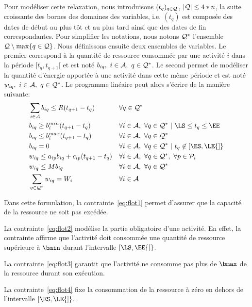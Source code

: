Pour modéliser cette relaxation, nous introduisons $(t_q)_{q \in {\cal Q}}$,
$| {\cal Q} | \le 4*n$, la suite croissante des bornes des domaines des
variables, i.e. $(t_q)$ est composée des dates de début au plus tôt et
au plus tard ainsi que des dates de fin correspondantes. Pour
simplifier les notations, nous notons ${\cal Q}^* $ l'ensemble ${\cal Q}
\setminus\max\{q \in {\cal Q}\}$. Nous définissons ensuite deux ensembles de
variables. Le premier correspond à la quantité de ressource consommée 
par une activité $i$ dans la période $[t_q,t_{q+1}[$ et est noté
$b_{iq},\ i \in {\cal A},\ q \in {\cal Q}^*$. Le second permet de modéliser la
quantité d'énergie apportée à une activité dans cette même période et
est noté $w_{iq},\ i \in {\cal A},\ q \in {\cal Q}^*$. Le programme linéaire peut
alors s'écrire de la manière suivante:
\begin{align}
  &\sum_{i \in \A} b_{iq} \le R(t_{q+1}- t_q) & & 
  \forall q \in \Q^* \label{eq:flot1}\\
  &b_{iq} \ge b_i^{min}(t_{q+1}-t_q) & & \forall i \in \A,
  \ \forall q \in \Q^*\ | \ \LS \le t_q \le \EE \label{eq:flot2}\\
  &b_{iq} \le b_i^{max} (t_{q+1} - t_q) & &
  \forall i \in \A,\ \forall q \in \Q^* \label{eq:flot3}\\
  &b_{iq}=0 & & \forall i \in \A, \ 
  \forall q \in \Q^*\  |\ t_q \not\in [\ES,\LE{]} \label{eq:flot4}\\  
  &w_{iq} \le a_{ip}b_{iq}+c_{ip}(t_{q+1}-t_q) & &
  \forall i \in \A, \ \forall q \in \Q^*,\  \forall p \in \P_i \label{eq:flot5}\\
  &w_{iq} \le Mb_{iq} & &
  \forall i \in \A,\ \forall q \in \Q^*\ \label{eq:flot6}\\
  &\sum_{q\in \Q^*} w_{iq} = W_i  & &
  \forall i \in \A \label{eq:flot7}
  \end{align}

Dans cette formulation, la contrainte~\eqref{eq:flot1} permet
d'assurer que la capacité de la ressource ne soit pas excédée. 

La contrainte~\eqref{eq:flot2} modélise la partie
obligatoire d'une activité. En effet, la contrainte affirme que
l'activité doit consommée une quantité de ressource supérieure à
$\bmin$ durant l'intervalle $[\LS,\EE{[}$.

La contrainte~\eqref{eq:flot3}  garantit que l'activité ne consomme
pas plus de $\bmax$ de la ressource durant son exécution. 

La contrainte~\eqref{eq:flot4} fixe la consommation de la ressource à
zéro en dehors de l'intervalle $[\ES,\LE{]}$.

